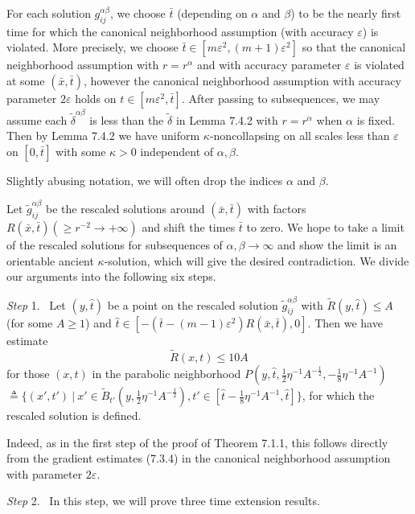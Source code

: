 For each solution $g^{\alpha\beta}_{ij}$, we choose $\bar{t}$
(depending on $\alpha$ and $\beta$) to be the nearly first time
for which the canonical neighborhood assumption (with accuracy
$\varepsilon$) is violated. More precisely, we choose
$\bar{t}\in[m\varepsilon^2,(m+1)\varepsilon^2]$ so that the
canonical neighborhood assumption with $r=r^{\alpha}$ and with
accuracy parameter $\varepsilon$ is violated at some
$(\bar{x},\bar{t})$, however the canonical neighborhood assumption
with accuracy parameter $2\varepsilon$ holds on
$t\in[m\varepsilon^2,\bar{t}]$. After passing to subsequences, we
may assume each $\widetilde{\delta}^{\alpha\beta}$ is less than
the $\widetilde{\delta}$ in Lemma 7.4.2 with $r=r^{\alpha}$ when
$\alpha$ is fixed. Then by Lemma 7.4.2 we have uniform
$\kappa$-noncollapsing on all scales less than $\varepsilon$ on
$[0,\bar{t}]$ with some $\kappa>0$ independent of $\alpha,\beta$.

Slightly abusing notation, we will often drop the indices $\alpha$
and $\beta$.

Let $\widetilde{g}^{\alpha\beta}_{ij}$ be the rescaled solutions
around $(\bar{x},\bar{t})$ with factors $R(\bar{x},\bar{t})(\geq
r^{-2}\rightarrow+\infty)$ and shift the times $\bar{t}$ to zero.
We hope to take a limit of the rescaled solutions for subsequences
of $\alpha,\beta\rightarrow\infty$ and show the limit is an
orientable ancient $\kappa$-solution, which will give the desired
contradiction. We divide our arguments into the following six
steps.

\medskip
{\it Step} 1. \  Let $(y,\hat{t})$ be a point on the rescaled
solution $\widetilde{g}^{\alpha\beta}_{ij}$ with
$\widetilde{R}(y,\hat{t})\leq A$ (for some $A\geq 1$) and
$\hat{t}\in [-(\bar{t} -
(m-1)\varepsilon^{2})R(\bar{x},\bar{t}),0]$. Then we have estimate
\begin{equation}
\widetilde{R}(x,t)\leq10A %
\end{equation} for those $(x,t)$ in the parabolic neighborhood
$P(y,\hat{t},\frac{1}{2}\eta^{-1}A^{-\frac{1}{2}},
-\frac{1}{8}\eta^{-1}A^{-1})$ $\triangleq\{(x',t')\ |\ x'\in
\widetilde{B}_{t'}(y,\frac{1}{2}\eta^{-1}A^{-\frac{1}{2}}),
t'\in[\hat{t}-\frac{1}{8}\eta^{-1}A^{-1},\hat{t}]\}$, for which
the rescaled solution is defined.

Indeed, as in the first step of the proof of Theorem 7.1.1, this
follows directly from the gradient estimates (7.3.4) in the
canonical neighborhood assumption with parameter $2\varepsilon$.

\medskip
{\it Step} 2. \ In this step, we will prove three time extension
results.

